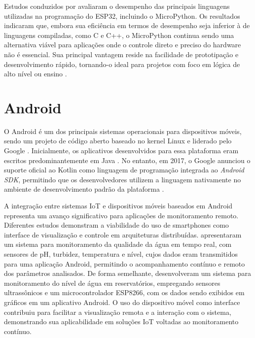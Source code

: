 Estudos conduzidos por  avaliaram o desempenho das principais linguagens utilizadas na programação do ESP32, incluindo o MicroPython. Os resultados indicaram que, embora sua eficiência em termos de desempenho seja inferior à de linguagens compiladas, como C e C++, o MicroPython continua sendo uma alternativa viável para aplicações onde o controle direto e preciso do hardware não é essencial. Sua principal vantagem reside na facilidade de prototipação e desenvolvimento rápido, tornando-o ideal para projetos com foco em lógica de alto nível ou ensino \cite{tanganelli2019rapid}.



\section{Android}

O Android é um dos principais sistemas operacionais para dispositivos móveis, sendo um projeto de código aberto baseado no kernel Linux e liderado pelo Google \cite{ABLESON2011}. Inicialmente, os aplicativos desenvolvidos para essa plataforma eram escritos predominantemente em Java \cite{ABLESON2011}. No entanto, em 2017, o Google anunciou o suporte oficial ao Kotlin como linguagem de programação integrada ao \textit{Android SDK}, permitindo que os desenvolvedores utilizem a linguagem nativamente no ambiente de desenvolvimento padrão da plataforma \cite{SILLS2023}.

A integração entre sistemas IoT e dispositivos móveis baseados em Android representa um avanço significativo para aplicações de monitoramento remoto. Diferentes estudos demonstram a viabilidade do uso de smartphones como interface de visualização e controle em arquiteturas distribuídas.  apresentaram um sistema para monitoramento da qualidade da água em tempo real, com sensores de pH, turbidez, temperatura e nível, cujos dados eram transmitidos para uma aplicação Android, permitindo o acompanhamento contínuo e remoto dos parâmetros analisados. De forma semelhante,  desenvolveram um sistema para monitoramento do nível de água em reservatórios, empregando sensores ultrassônicos e um microcontrolador ESP8266, com os dados sendo exibidos em gráficos em um aplicativo Android. O uso do dispositivo móvel como interface contribuiu para facilitar a visualização remota e a interação com o sistema, demonstrando sua aplicabilidade em soluções IoT voltadas ao monitoramento contínuo.

